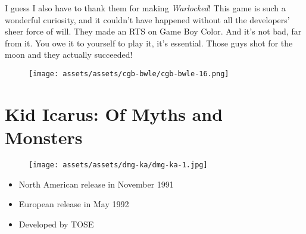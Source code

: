 \documentclass{book}
\begin{document}
I guess I also have to thank them for making \emph{Warlocked}! This game is such a wonderful curiosity, and it couldn’t have happened without all the developers’ sheer force of will. They made an RTS on Game Boy Color. And it’s not bad, far from it. You owe it to yourself to play it, it’s essential. Those guys shot for the moon and they actually succeeded!

\begin{figure}[hbt]
\vskip 10pt
\centering \texttt{[image: assets/assets/cgb-bwle/cgb-bwle-16.png]}
\vskip 6pt
\end{figure}



\begingroup \chapter*{Kid Icarus: Of Myths and Monsters} \endgroup
\begin{figure}[H]
\vskip 4pt
\centering
\texttt{[image: assets/assets/dmg-ka/dmg-ka-1.jpg]}\end{figure}
\begin{itemize} [nosep]




\item North American release in November 1991







\item European release in May 1992
































\item Developed by TOSE

\end{itemize}\noindent
\end{document}
